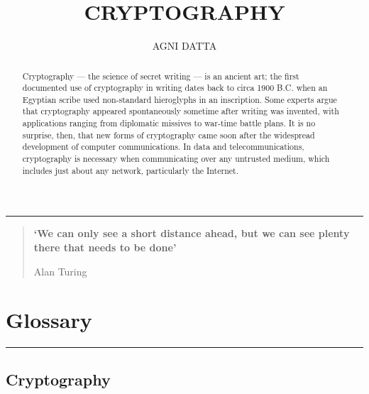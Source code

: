 \documentclass[british]{article}
\begin{document}
\title{\textbf{\Huge{}CRYPTOGRAPHY}}
\author{AGNI DATTA}
\maketitle
\begin{center}
\rule[0.5ex]{0.5\columnwidth}{0.75pt}
\par\end{center}
\begin{quotation}
\begin{center}
\textbf{`We can only see a short distance ahead, but we can see plenty
there that needs to be done'}
\par\end{center}
\begin{center}
Alan Turing
\par\end{center}

\end{quotation}
\medskip{}

\begin{abstract}
{\normalsize{}Cryptography --- the science of secret writing ---
is an ancient art; the first documented use of cryptography in writing
dates back to circa 1900 B.C. when an Egyptian scribe used non-standard
hieroglyphs in an inscription. Some experts argue that cryptography
appeared spontaneously sometime after writing was invented, with applications
ranging from diplomatic missives to war-time battle plans. It is no
surprise, then, that new forms of cryptography came soon after the
widespread development of computer communications. In data and telecommunications,
cryptography is necessary when communicating over any untrusted medium,
which includes just about any network, particularly the Internet.}{\normalsize\par}
\end{abstract}
\pagebreak{}

\tableofcontents{}

\vfill{}

\pagebreak{}

\section{Glossary}
\begin{center}
\rule[0.5ex]{450bp}{0.75pt}
\par\end{center}

\subsection{Cryptography}
\end{document}
